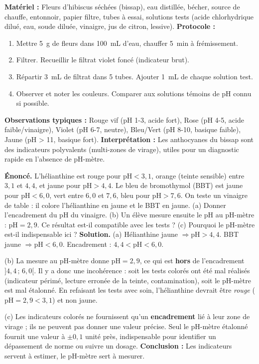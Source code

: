 \documentclass[11pt]{article}
\begin{document}
\begin{experience}
\textbf{Matériel :} Fleurs d'hibiscus séchées (bissap), eau distillée, bécher, source de chauffe, entonnoir, papier filtre, tubes à essai, solutions tests (acide chlorhydrique dilué, eau, soude diluée, vinaigre, jus de citron, lessive).
\textbf{Protocole :}
\begin{enumerate}
\item Mettre \SI{5}{g} de fleurs dans \SI{100}{mL} d'eau, chauffer \SI{5}{min} à frémissement.
\item Filtrer. Recueillir le filtrat violet foncé (indicateur brut).
\item Répartir \SI{3}{mL} de filtrat dans 5 tubes. Ajouter \SI{1}{mL} de chaque solution test.
\item Observer et noter les couleurs. Comparer aux solutions témoins de pH connu si possible.
\end{enumerate}
\textbf{Observations typiques :} Rouge vif (pH 1-3, acide fort), Rose (pH 4-5, acide faible/vinaigre), Violet (pH 6-7, neutre), Bleu/Vert (pH 8-10, basique faible), Jaune (pH > 11, basique fort).
\textbf{Interprétation :} Les anthocyanes du bissap sont des indicateurs polyvalents (multi-zones de virage), utiles pour un diagnostic rapide en l'absence de pH-mètre.
\end{experience}

\begin{exoresolu}
\textbf{Énoncé.} L'hélianthine est rouge pour $\mathrm{pH} < 3{,}1$, orange (teinte sensible) entre $3{,}1$ et $4{,}4$, et jaune pour $\mathrm{pH} > 4{,}4$. Le bleu de bromothymol (BBT) est jaune pour $\mathrm{pH} < 6{,}0$, vert entre $6{,}0$ et $7{,}6$, bleu pour $\mathrm{pH} > 7{,}6$. On teste un vinaigre de table : il colore l'hélianthine en jaune et le BBT en jaune. (a) Donner l'encadrement du pH du vinaigre. (b) Un élève mesure ensuite le pH au pH-mètre : $\mathrm{pH} = 2{,}9$. Ce résultat est-il compatible avec les tests ? (c) Pourquoi le pH-mètre est-il indispensable ici ?
\tcblower
\textbf{Solution.}
(a) Hélianthine jaune $\Rightarrow \mathrm{pH} > 4{,}4$. BBT jaune $\Rightarrow \mathrm{pH} < 6{,}0$.
Encadrement : $4{,}4 < \mathrm{pH} < 6{,}0$.

(b) La mesure au pH-mètre donne $\mathrm{pH} = 2{,}9$, ce qui est \textbf{hors} de l'encadrement $]4{,}4\,;\,6{,}0[$. Il y a donc une incohérence : soit les tests colorés ont été mal réalisés (indicateur périmé, lecture erronée de la teinte, contamination), soit le pH-mètre est mal étalonné. En refaisant les tests avec soin, l'hélianthine devrait être \emph{rouge} ($\mathrm{pH} = 2{,}9 < 3{,}1$) et non jaune.

(c) Les indicateurs colorés ne fournissent qu'un \textbf{encadrement} lié à leur zone de virage ; ils ne peuvent pas donner une valeur précise. Seul le pH-mètre étalonné fournit une valeur à $\pm 0{,}1$ unité près, indispensable pour identifier un dépassement de norme ou suivre un dosage.
\textbf{Conclusion :} Les indicateurs servent à estimer, le pH-mètre sert à mesurer.
\end{exoresolu}
\end{document}
